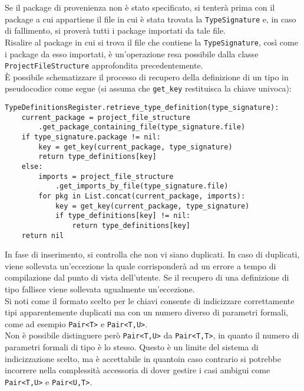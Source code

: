 Se il package di provenienza non è stato specificato, si tenterà prima con il package a cui appartiene il file 
in cui è stata trovata la \texttt{TypeSignature} e, in caso di fallimento, si proverà tutti i package 
importati da tale file. \\

Risalire al package in cui si trova il file che contiene la \texttt{TypeSignature}, così come i package da esso importati, 
è un'operazione resa possibile dalla classe \texttt{ProjectFileStructure} approfondita precedentemente. \\


È possibile schematizzare il processo di recupero della definizione di un tipo in pseudocodice come segue
(si assuma che \texttt{get\_key} restituisca la chiave univoca): \\

\vspace{0.5cm}
\begin{lstlisting}[frame=single]
TypeDefinitionsRegister.retrieve_type_definition(type_signature):
    current_package = project_file_structure
        .get_package_containing_file(type_signature.file)
    if type_signature.package != nil:
        key = get_key(current_package, type_signature)
        return type_definitions[key]
    else:
        imports = project_file_structure
            .get_imports_by_file(type_signature.file)
        for pkg in List.concat(current_package, imports):
            key = get_key(current_package, type_signature)
            if type_definitions[key] != nil:
                return type_definitions[key]
    return nil
\end{lstlisting}
\vspace{0.5cm}

In fase di inserimento, si controlla che non vi siano duplicati. In caso di duplicati, viene 
sollevata un'eccezione la quale corrisponderà ad un errore a tempo di compilazione dal punto 
di vista dell'utente. Se il recupero di una definizione di tipo fallisce viene sollevata 
ugualmente un'eccezione. \\

Si noti come il formato scelto per le chiavi consente di indicizzare correttamente tipi 
apparentemente duplicati ma con un numero diverso di parametri formali, come ad esempio 
\texttt{Pair<T>} e \texttt{Pair<T,U>}. \\

Non è possibile distinguere però \texttt{Pair<T,U>} da \texttt{Pair<T,T>}, in quanto il 
numero di parametri formali di tipo è lo stesso. Questo è un limite del sistema di indicizzazione 
scelto, ma è accettabile in quantoin caso contrario si potrebbe incorrere nella complessità 
accessoria di dover gestire i casi ambigui come \texttt{Pair<T,U>} e \texttt{Pair<U,T>}.

